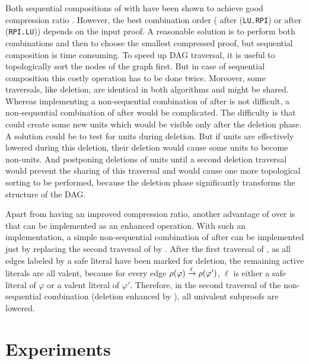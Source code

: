 \documentclass{llncs}
\begin{document}
Both sequential compositions of {\LowerUnits} with {\RPI} have been shown to achieve good
compression ratio \cite{LURPI}. However, the best combination order ({\LowerUnits} after
{\RPI} (\texttt{LU.RPI}) or {\RPI} after {\LowerUnits} (\texttt{RPI.LU})) depends on the input proof. A reasonable solution is to perform both combinations and then to choose the smallest
compressed proof, but sequential composition is time consuming. To speed up DAG traversal, it is useful to topologically sort the nodes of the graph first. But in case of sequential composition this costly operation has to be done twice. Moreover, some traversals, like deletion, are identical in both algorithms and might be shared. Whereas implementing a non-sequential combination of {\RPI} after {\LowerUnits} is not difficult, a non-sequential combination of {\LowerUnits} after {\RPI} would be complicated. 
The difficulty is that {\RPI} could create some new units which would be visible only after the deletion
phase.  A solution could be to test for units during deletion. But if units are
effectively lowered during this deletion, their deletion would cause some units to become non-units.
And postponing deletions of units until a second deletion traversal would prevent the sharing of
this traversal and would cause one more topological sorting to be performed, because the deletion phase significantly transforms the structure of the DAG.

Apart from having an improved compression ratio, another advantage of {\LowerUnivalents} over
{\LowerUnits} is that {\LowerUnivalents} can be implemented as an enhanced 
operation. With such an implementation, a simple non-sequential combination of {\LowerUnivalents}
after {\RPI} can be implemented just by replacing the second traversal of {\RPI} by
{\LowerUnivalents}. After the first traversal of {\RPI}, as all edges labeled by a safe literal have been marked for deletion, the remaining active literals are all valent, because for every edge $\rho(\varphi) \xrightarrow{\ell} \rho(\varphi')$, $\ell$ is either a safe literal
of $\varphi$ or a valent literal of $\varphi'$.  Therefore, in the second traversal of the non-sequential combination (deletion enhanced by {\LowerUnivalents}), all univalent subproofs are lowered.



\section{Experiments} \label{sec:exp}
\end{document}
